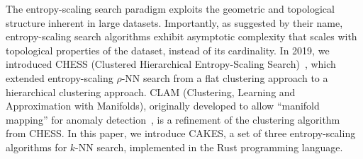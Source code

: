 The entropy-scaling search paradigm exploits the geometric and topological structure inherent in large datasets.
Importantly, as suggested by their name, entropy-scaling search algorithms exhibit asymptotic complexity that scales with topological properties of the dataset, instead of its cardinality.
In 2019, we introduced CHESS (Clustered Hierarchical Entropy-Scaling Search)~\cite{ishaq2019clustered}, which extended entropy-scaling $\rho$-NN search from a flat clustering approach to a hierarchical clustering approach.
CLAM (Clustering, Learning and Approximation with Manifolds), originally developed to allow ``manifold mapping'' for anomaly detection~\cite{ishaq2021clustered}, is a refinement of the clustering algorithm from CHESS.
In this paper, we introduce CAKES, a set of three entropy-scaling algorithms for $k$-NN search, implemented in the Rust programming language.
